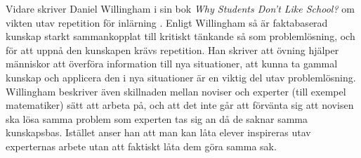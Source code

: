%
%
%
%
%
\textcolor{turkos}{Vidare skriver Daniel Willingham i sin bok \textsl{Why Students Don't Like School?} om vikten utav repetition för inlärning \cite{WhyDontStudents}. Enligt Willingham så är faktabaserad kunskap starkt sammankopplat till kritiskt tänkande så som problemlösning, och för att uppnå den kunskapen krävs repetition. Han skriver att övning hjälper människor att överföra information till nya situationer, att kunna ta gammal kunskap och applicera den i nya situationer är en viktig del utav problemlösning. Willingham beskriver även skillnaden mellan noviser och experter (till exempel matematiker) sätt att arbeta på, och att det inte går att förvänta sig att novisen ska lösa samma problem som experten tas sig an då de saknar samma kunskapsbas. Istället anser han att man kan låta elever inspireras utav experternas arbete utan att faktiskt låta dem göra samma sak. } 




